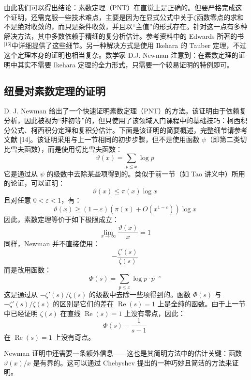 由此我们可以得出结论：素数定理（PNT）在直觉上是正确的。但要严格完成这个证明，还需克服一些技术难点，主要是因为在显式公式中关于$\zeta$函数零点的求和不是绝对收敛的，而只是条件收敛，并且以“主值”的形式存在。针对这一点有多种解决方法，其中多数依赖于精细的复分析估计。参考资料中的 Edwards 所著的书\(^\text{[16]}\)中详细提供了这些细节。另一种解决方式是使用 Ikehara 的 Tauber 定理，不过这个定理本身的证明也相当复杂。数学家 D.J. Newman 注意到：在素数定理的证明中其实不需要 Ikehara 定理的全力形式，只需要一个较易证明的特例即可。
\subsection{纽曼对素数定理的证明}
D. J. Newman 给出了一个快速证明素数定理（PNT）的方法。该证明由于依赖复分析，因此被视为“非初等”的，但只使用了该领域入门课程中的基础技巧：柯西积分公式、柯西积分定理和复积分估计。下面是该证明的简要概述，完整细节请参考文献 [14]。该证明采用与上一节相同的初步步骤，但不是使用函数 $\psi$（即第二类切比雪夫函数），而是使用切比雪夫函数：
$$
\vartheta(x) = \sum_{p \leq x} \log p~
$$
它是通过从 $\psi$ 的级数中去除某些项得到的。类似于前一节（如 Tao 讲义中）所用的论证，可以证明：
$$
\vartheta(x) \leq \pi(x) \log x~
$$
且对任意 $0 < \varepsilon < 1$，有：
$$
\vartheta(x) \geq (1 - \varepsilon)\left(\pi(x) + O(x^{1 - \varepsilon})\right) \log x~
$$
因此，素数定理等价于如下极限成立：
$$
\lim_{x \to \infty} \frac{\vartheta(x)}{x} = 1~
$$
同样，Newman 并不直接使用：
$$
-\frac{\zeta'(s)}{\zeta(s)}~
$$
而是改用函数：
$$
\Phi(s) = \sum_{p \leq x} \log p \cdot p^{-s}~
$$
这是通过从 $-\zeta'(s)/\zeta(s)$ 的级数中去除一些项得到的。函数 $\Phi(s)$ 与 $-\zeta'(s)/\zeta(s)$ 的区别是它们的差在 $\operatorname{Re}(s) = 1$ 上是全纯的函数。由于上一节中已经证明 $\zeta(s)$ 在直线 $\operatorname{Re}(s) = 1$ 上没有零点，因此：
$$
\Phi(s) - \frac{1}{s - 1}~
$$
在 $\operatorname{Re}(s) = 1$ 上没有奇点。

Newman 证明中还需要一条额外信息——这也是其简明方法中的估计关键：函数 $\vartheta(x)/x$ 是有界的。这可以通过 Chebyshev 提出的一种巧妙且简洁的方法来证明。
